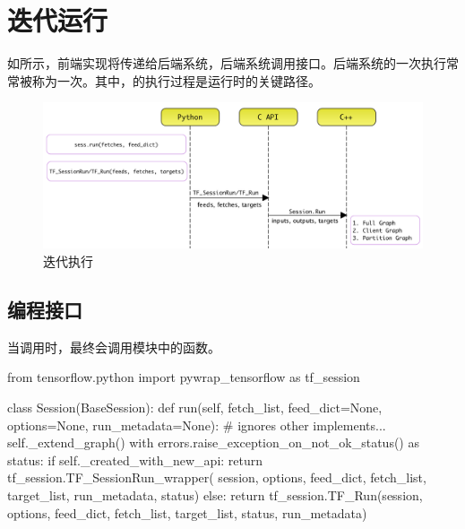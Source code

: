 \section{迭代运行}

\begin{content}

如所示，前端实现将传递给后端系统，后端系统调用接口。后端系统的一次执行常常被称为一次。其中，的执行过程是运行时的关键路径。

\begin{figure}[H]
\centering
\includegraphics[width=1.0\textwidth]{figures/py-session-run.png}
\caption{迭代执行}
 \label{fig:py-session-run}
\end{figure}

\subsection{编程接口}

当调用时，最终会调用模块中的函数。

\begin{leftbar}
\begin{python}[caption={tensorflow/python/client/session.py}]
from tensorflow.python import pywrap_tensorflow as tf_session

class Session(BaseSession):
  def run(self, fetch_list, feed_dict=None, options=None, run_metadata=None):
    # ignores other implements...
    self._extend_graph()
    with errors.raise_exception_on_not_ok_status() as status:
      if self._created_with_new_api:
        return tf_session.TF_SessionRun_wrapper(
            session, options, feed_dict, fetch_list, target_list,
            run_metadata, status)
      else:
        return tf_session.TF_Run(session, options,
                                 feed_dict, fetch_list, target_list,
                                 status, run_metadata)
\end{python}
\end{leftbar}



\end{content}
